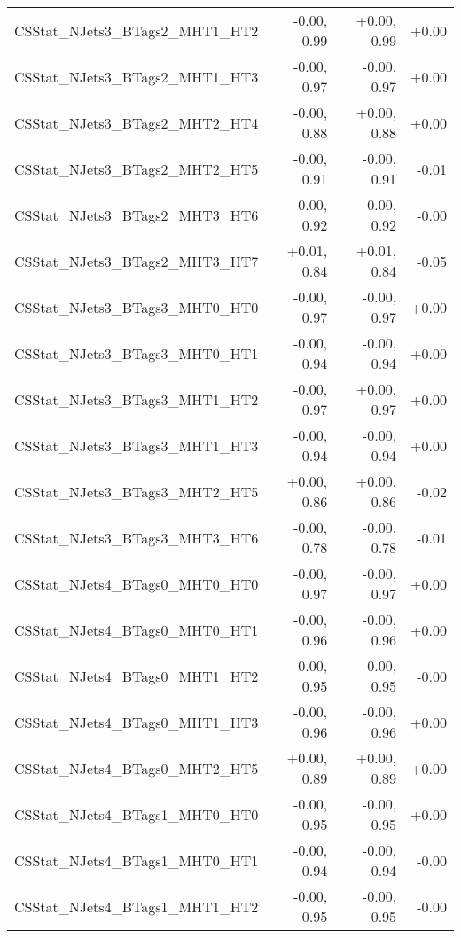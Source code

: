 \begin{tabular}{|l|r|r|r|}
CSStat\_NJets3\_BTags2\_MHT1\_HT2        &      -0.00, 0.99 &     +0.00, 0.99 &  +0.00 \\
CSStat\_NJets3\_BTags2\_MHT1\_HT3        &      -0.00, 0.97 &     -0.00, 0.97 &  +0.00 \\
CSStat\_NJets3\_BTags2\_MHT2\_HT4        &      -0.00, 0.88 &     +0.00, 0.88 &  +0.00 \\
CSStat\_NJets3\_BTags2\_MHT2\_HT5        &      -0.00, 0.91 &     -0.00, 0.91 &  -0.01 \\
CSStat\_NJets3\_BTags2\_MHT3\_HT6        &      -0.00, 0.92 &     -0.00, 0.92 &  -0.00 \\
CSStat\_NJets3\_BTags2\_MHT3\_HT7        &      +0.01, 0.84 &     +0.01, 0.84 &  -0.05 \\
CSStat\_NJets3\_BTags3\_MHT0\_HT0        &      -0.00, 0.97 &     -0.00, 0.97 &  +0.00 \\
CSStat\_NJets3\_BTags3\_MHT0\_HT1        &      -0.00, 0.94 &     -0.00, 0.94 &  +0.00 \\
CSStat\_NJets3\_BTags3\_MHT1\_HT2        &      -0.00, 0.97 &     +0.00, 0.97 &  +0.00 \\
CSStat\_NJets3\_BTags3\_MHT1\_HT3        &      -0.00, 0.94 &     -0.00, 0.94 &  +0.00 \\
CSStat\_NJets3\_BTags3\_MHT2\_HT5        &      +0.00, 0.86 &     +0.00, 0.86 &  -0.02 \\
CSStat\_NJets3\_BTags3\_MHT3\_HT6        &      -0.00, 0.78 &     -0.00, 0.78 &  -0.01 \\
CSStat\_NJets4\_BTags0\_MHT0\_HT0        &      -0.00, 0.97 &     -0.00, 0.97 &  +0.00 \\
CSStat\_NJets4\_BTags0\_MHT0\_HT1        &      -0.00, 0.96 &     -0.00, 0.96 &  +0.00 \\
CSStat\_NJets4\_BTags0\_MHT1\_HT2        &      -0.00, 0.95 &     -0.00, 0.95 &  -0.00 \\
CSStat\_NJets4\_BTags0\_MHT1\_HT3        &      -0.00, 0.96 &     -0.00, 0.96 &  +0.00 \\
CSStat\_NJets4\_BTags0\_MHT2\_HT5        &      +0.00, 0.89 &     +0.00, 0.89 &  +0.00 \\
CSStat\_NJets4\_BTags1\_MHT0\_HT0        &      -0.00, 0.95 &     -0.00, 0.95 &  +0.00 \\
CSStat\_NJets4\_BTags1\_MHT0\_HT1        &      -0.00, 0.94 &     -0.00, 0.94 &  -0.00 \\
CSStat\_NJets4\_BTags1\_MHT1\_HT2        &      -0.00, 0.95 &     -0.00, 0.95 &  -0.00 \\

\end{tabular}
